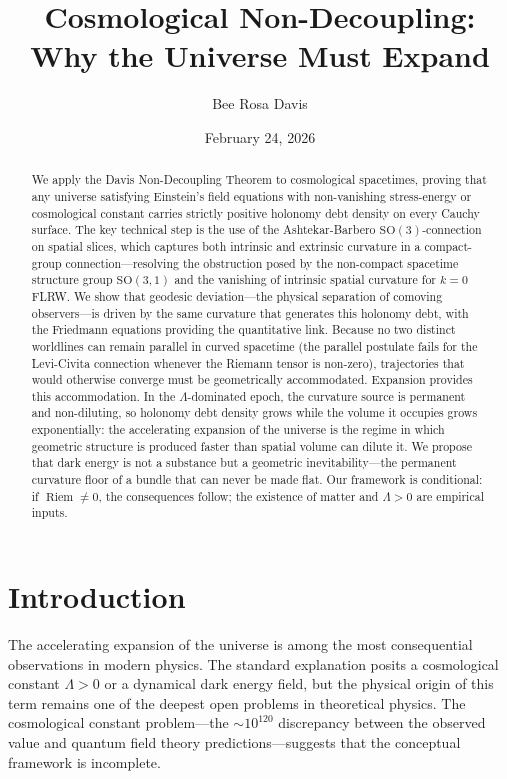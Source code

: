 \documentclass[12pt]{amsart}
\title[Cosmological Non-Decoupling]{Cosmological Non-Decoupling: \\ Why the Universe Must Expand}
\author{Bee Rosa Davis}
\date{February 24, 2026}
\theoremstyle{definition}
\newcommand{\Riem}{\operatorname{Riem}}
\begin{document}
\begin{abstract}
We apply the Davis Non-Decoupling Theorem to cosmological spacetimes, proving that any universe satisfying Einstein's field equations with non-vanishing stress-energy or cosmological constant carries strictly positive holonomy debt density on every Cauchy surface.  The key technical step is the use of the Ashtekar-Barbero $\mathrm{SO}(3)$-connection on spatial slices, which captures both intrinsic and extrinsic curvature in a compact-group connection---resolving the obstruction posed by the non-compact spacetime structure group $\mathrm{SO}(3,1)$ and the vanishing of intrinsic spatial curvature for $k = 0$ FLRW.  We show that geodesic deviation---the physical separation of comoving observers---is driven by the same curvature that generates this holonomy debt, with the Friedmann equations providing the quantitative link.  Because no two distinct worldlines can remain parallel in curved spacetime (the parallel postulate fails for the Levi-Civita connection whenever the Riemann tensor is non-zero), trajectories that would otherwise converge must be geometrically accommodated.  Expansion provides this accommodation.  In the $\Lambda$-dominated epoch, the curvature source is permanent and non-diluting, so holonomy debt density grows while the volume it occupies grows exponentially: the accelerating expansion of the universe is the regime in which geometric structure is produced faster than spatial volume can dilute it.  We propose that dark energy is not a substance but a geometric inevitability---the permanent curvature floor of a bundle that can never be made flat.  Our framework is conditional: if $\Riem \neq 0$, the consequences follow; the existence of matter and $\Lambda > 0$ are empirical inputs.
\end{abstract}

\maketitle

\setcounter{tocdepth}{1}
\tableofcontents

\bigskip

\section{Introduction}

The accelerating expansion of the universe is among the most consequential observations in modern physics.  The standard explanation posits a cosmological constant $\Lambda > 0$ or a dynamical dark energy field, but the physical origin of this term remains one of the deepest open problems in theoretical physics.  The cosmological constant problem---the $\sim 10^{120}$ discrepancy between the observed value and quantum field theory predictions---suggests that the conceptual framework is incomplete.
\end{document}
